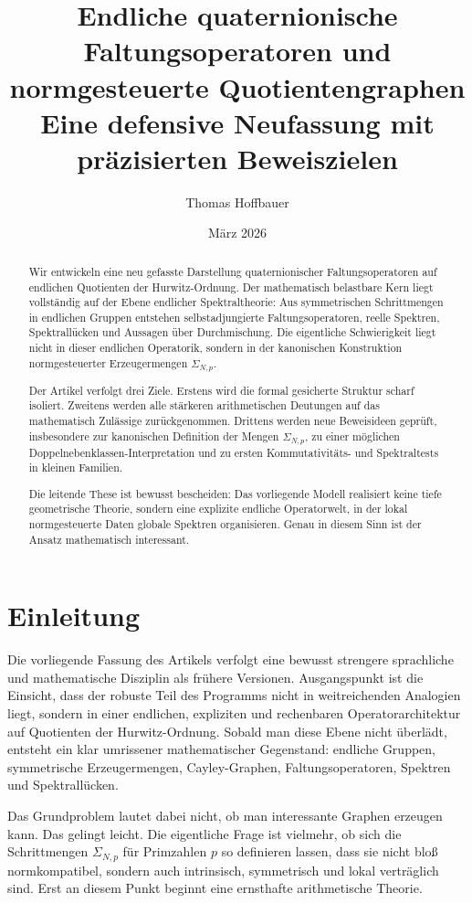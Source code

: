 \documentclass[12pt,a4paper]{article}
\title{\textbf{Endliche quaternionische Faltungsoperatoren und normgesteuerte Quotientengraphen}\\
	\large Eine defensive Neufassung mit präzisierten Beweiszielen}
\author{Thomas Hoffbauer}
\date{März 2026}
\theoremstyle{plain}
\theoremstyle{definition}
\theoremstyle{remark}
\begin{document}
	\maketitle
	
	\begin{abstract}
		Wir entwickeln eine neu gefasste Darstellung quaternionischer Faltungsoperatoren auf endlichen Quotienten der Hurwitz-Ordnung. Der mathematisch belastbare Kern liegt vollständig auf der Ebene endlicher Spektraltheorie: Aus symmetrischen Schrittmengen in endlichen Gruppen entstehen selbstadjungierte Faltungsoperatoren, reelle Spektren, Spektrallücken und Aussagen über Durchmischung. Die eigentliche Schwierigkeit liegt nicht in dieser endlichen Operatorik, sondern in der kanonischen Konstruktion normgesteuerter Erzeugermengen $\Sigma_{N,p}$.
		
		Der Artikel verfolgt drei Ziele. Erstens wird die formal gesicherte Struktur scharf isoliert. Zweitens werden alle stärkeren arithmetischen Deutungen auf das mathematisch Zulässige zurückgenommen. Drittens werden neue Beweisideen geprüft, insbesondere zur kanonischen Definition der Mengen $\Sigma_{N,p}$, zu einer möglichen Doppelnebenklassen-Interpretation und zu ersten Kommutativitäts- und Spektraltests in kleinen Familien.
		
		Die leitende These ist bewusst bescheiden: Das vorliegende Modell realisiert keine tiefe geometrische Theorie, sondern eine explizite endliche Operatorwelt, in der lokal normgesteuerte Daten globale Spektren organisieren. Genau in diesem Sinn ist der Ansatz mathematisch interessant.
	\end{abstract}
	
	\tableofcontents
	
	\section{Einleitung}
	Die vorliegende Fassung des Artikels verfolgt eine bewusst strengere sprachliche und mathematische Disziplin als frühere Versionen. Ausgangspunkt ist die Einsicht, dass der robuste Teil des Programms nicht in weitreichenden Analogien liegt, sondern in einer endlichen, expliziten und rechenbaren Operatorarchitektur auf Quotienten der Hurwitz-Ordnung. Sobald man diese Ebene nicht überlädt, entsteht ein klar umrissener mathematischer Gegenstand: endliche Gruppen, symmetrische Erzeugermengen, Cayley-Graphen, Faltungsoperatoren, Spektren und Spektrallücken.
	
	Das Grundproblem lautet dabei nicht, ob man interessante Graphen erzeugen kann. Das gelingt leicht. Die eigentliche Frage ist vielmehr, ob sich die Schrittmengen $\Sigma_{N,p}$ für Primzahlen $p$ so definieren lassen, dass sie nicht bloß normkompatibel, sondern auch intrinsisch, symmetrisch und lokal verträglich sind. Erst an diesem Punkt beginnt eine ernsthafte arithmetische Theorie.
	
\end{document}
